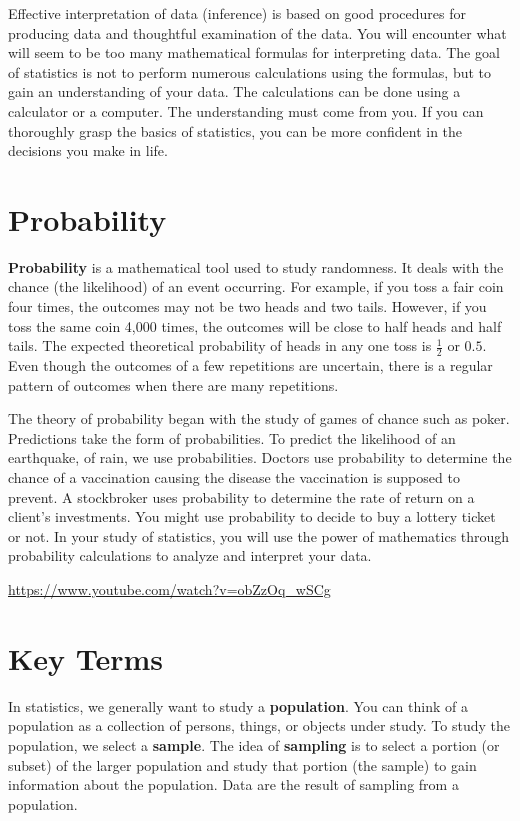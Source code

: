 \documentclass[
  letterpaper,
  DIV=11,
  numbers=noendperiod]{scrreprt}
\begin{document}
Effective interpretation of data (inference) is based on good procedures
for producing data and thoughtful examination of the data. You will
encounter what will seem to be too many mathematical formulas for
interpreting data. The goal of statistics is not to perform numerous
calculations using the formulas, but to gain an understanding of your
data. The calculations can be done using a calculator or a computer. The
understanding must come from you. If you can thoroughly grasp the basics
of statistics, you can be more confident in the decisions you make in
life.

\section{Probability}\label{probability}

\textbf{Probability} is a mathematical tool used to study randomness. It
deals with the chance (the likelihood) of an event occurring. For
example, if you toss a fair coin four times, the outcomes may not be two
heads and two tails. However, if you toss the same coin 4,000 times, the
outcomes will be close to half heads and half tails. The expected
theoretical probability of heads in any one toss is \(\frac{1}{2}\) or
\(0.5\). Even though the outcomes of a few repetitions are uncertain,
there is a regular pattern of outcomes when there are many repetitions.

The theory of probability began with the study of games of chance such
as poker. Predictions take the form of probabilities. To predict the
likelihood of an earthquake, of rain, we use probabilities. Doctors use
probability to determine the chance of a vaccination causing the disease
the vaccination is supposed to prevent. A stockbroker uses probability
to determine the rate of return on a client's investments. You might use
probability to decide to buy a lottery ticket or not. In your study of
statistics, you will use the power of mathematics through probability
calculations to analyze and interpret your data.

\url{https://www.youtube.com/watch?v=obZzOq_wSCg}

\section{Key Terms}\label{key-terms}

In statistics, we generally want to study a \textbf{population}. You can
think of a population as a collection of persons, things, or objects
under study. To study the population, we select a \textbf{sample}. The
idea of \textbf{sampling} is to select a portion (or subset) of the
larger population and study that portion (the sample) to gain
information about the population. Data are the result of sampling from a
population.
\end{document}
